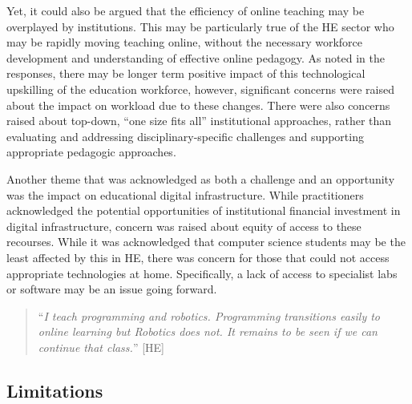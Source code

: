 \documentclass[sigconf]{acmart}
\begin{document}

Yet, it could also be argued that the efficiency of online teaching
may be overplayed by institutions. This may be particularly true of
the HE sector who may be rapidly moving teaching online, without the
necessary workforce development and understanding of effective online
pedagogy. As noted in the responses, there may be longer term positive
impact of this technological upskilling of the education workforce,
however, significant concerns were raised about the impact on workload
due to these changes. There were also concerns raised about top-down,
``one size fits all'' institutional approaches, rather than evaluating
and addressing disciplinary-specific challenges and supporting
appropriate pedagogic approaches.

Another theme that was acknowledged as both a challenge and an
opportunity was the impact on educational digital
infrastructure. While practitioners acknowledged the potential
opportunities of institutional financial investment in digital
infrastructure, concern was raised about equity of access to these
recourses. While it was acknowledged that computer science students
may be the least affected by this in HE, there was concern for those
that could not access appropriate technologies at home. Specifically,
a lack of access to specialist labs or software may be an issue going
forward.

\begin{quotation}
``{\emph{I teach programming and robotics.  Programming transitions
easily to online learning but Robotics does not.  It remains to be
seen if we can continue that class.}}'' [HE]
\end{quotation}

\subsection{Limitations}
\end{document}
